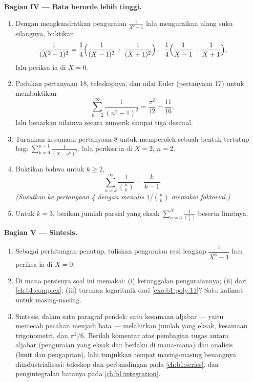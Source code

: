 \begin{problem}
\medskip
\noindent\textbf{Bagian IV --- Bata berorde lebih tinggi.}
\begin{enumerate}[resume]
  \item Dengan mengkuadratkan penguraian $\frac1{X^2-1}$ lalu
        menguraikan ulang suku silangnya, buktikan
        \[
        \frac1{(X^2-1)^2}
        = \frac14\Bigl(\frac1{(X-1)^2} + \frac1{(X+1)^2}\Bigr)
        - \frac14\Bigl(\frac1{X-1} - \frac1{X+1}\Bigr),
        \]
        lalu periksa ia di $X = 0$.
  \item Padukan pertanyaan 18, teleskopnya, dan nilai Euler
        (pertanyaan 17) untuk membuktikan
        \[
        \sum_{n=2}^{\infty}\frac1{(n^2-1)^2}
        = \frac{\pi^2}{12} - \frac{11}{16} ,
        \]
        lalu benarkan nilainya secara numerik sampai tiga desimal.
  \item Turunkan kesamaan pertanyaan 8 untuk memperoleh sebuah
        bentuk tertutup bagi $\sum_{k=0}^{n-1}\frac1{(X -
        \omega^k)^2}$, lalu periksa ia di $X = 2$, $n = 2$.
  \item Buktikan bahwa untuk $k \geq 2$,
        \[
        \sum_{n=k}^{\infty}\frac{1}{\binom nk} = \frac{k}{k-1} .
        \]
        \emph{(Susutkan ke pertanyaan 4 dengan menulis $1/\binom nk$ memakai
        faktorial.)}
  \item Untuk $k = 3$, berikan jumlah parsial yang eksak
        $\sum_{n=3}^{N}\frac1{\binom n3}$ beserta limitnya.
\end{enumerate}

\medskip
\noindent\textbf{Bagian V --- Sintesis.}
\begin{enumerate}[resume]
  \item Sebagai perhitungan penutup, tuliskan penguraian real
        lengkap $\dfrac1{X^6 - 1}$ lalu periksa ia di $X =
        0$.
  \item Di mana persisnya soal ini memakai: (i) ketunggalan
        penguraiannya; (ii)  dari
        \cref{ch:b1:complex}; (iii) turunan logaritmik
        dari \cref{exo:b1:poly:11}? Satu kalimat untuk masing-masing.
  \item Sintesis, dalam satu paragraf pendek: satu kesamaan aljabar
        --- yaitu memecah pecahan menjadi bata --- melahirkan jumlah
        yang eksak, kesamaan trigonometri, dan $\pi^2/6$. Berilah komentar atas
        pembagian tugas antara aljabar (penguraian yang eksak dan
        berlaku di mana-mana) dan analisis (limit dan
        pengapitan), lalu tunjukkan tempat masing-masing benangnya
        diindustrialisasi: teleskop dan perbandingan pada
        \cref{ch:b1:series}, dan pengintegralan batanya pada
        \cref{ch:b1:integration}.

\end{enumerate}
\end{problem}
